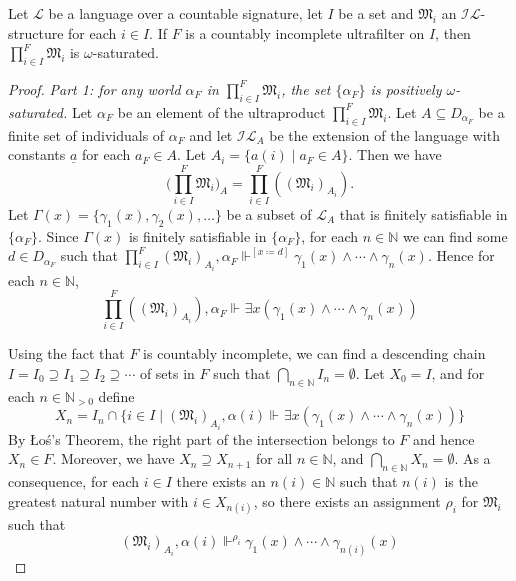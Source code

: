 \documentclass[submission,copyright,creativecommons]{eptcs}
\newcommand{\mo}{\mathfrak}
\newcommand{\IL}{\mathscr{I\!\!L}}   %
\newcommand{\LL}{\mathcal{L}}        %
\newcommand{\satisfySym}{\Vdash}
\newcommand{\satisfy}[4]{#1, #2 \satisfySym^{#4} #3}
\begin{document}
\begin{proposition}\label{prop:ultra-sat}
  Let $\LL$ be a language over a countable signature, let $I$ be a set and $\mo{M}_i$ an $\IL$-structure for each $i \in I$.
  If $F$ is a countably incomplete ultrafilter on $I$,
  then $\prod_{i \in I}^F\mo{M}_i$ is $\omega$-saturated.
\end{proposition}
\begin{proof}
\textit{Part 1: for any world $\alpha_F$ in $\prod_{i \in I}^F\mo{M}_i$,
        the set $\{ \alpha_F \}$ is positively $\omega$-saturated.}
%
  Let $\alpha_F$ be an element of the ultraproduct $\prod_{i \in I}^F \mo{M}_i$.
  Let $A \subseteq D_{\alpha_F}$ be a finite set of individuals of $\alpha_F$
  and let $\IL_A$ be the extension of the language with constants
  $\underline{a}$ for each $a_F \in A$.
  Let $A_i = \{ a(i) \mid a_F \in A \}$.
  Then we have
  \begin{equation*}
    \Big(\prod_{i \in I}^F\mo{M}_i\Big)_A = \prod_{i \in I}^F((\mo{M}_i)_{A_i}).
  \end{equation*}
% 
  Let $\Gamma(x)=\{ \gamma_1(x), \gamma_2(x), \ldots \}$ be a
  subset of $\LL_A$ that is
  finitely satisfiable in $\{ \alpha_F \}$. 
  Since $\Gamma(x)$ is finitely satisfiable in $\{ \alpha_F \}$,
  for each $n \in \mathbb{N}$ we can find some $d \in D_{\alpha_F}$ such that
  $\satisfy{\prod_{i \in I}^F(\mo{M}_i)_{A_i}}
           {\alpha_F}
           {\gamma_1(x) \wedge \cdots \wedge \gamma_n(x)}
           {[x \coloneq d]}$.
%
  Hence for each $n \in \mathbb{N}$,
  \begin{equation*} 
    \satisfy{\prod_{i \in I}^F((\mo{M}_i)_{A_i})}{\alpha_F}{\exists x(\gamma_1(x)\land\cdots\land\gamma_n(x))}{}
  \end{equation*}
  
  Using the fact that $F$ is countably incomplete,
  we can find a descending chain
  $I = I_0 \supseteq I_1 \supseteq I_2 \supseteq \cdots$ of sets in $F$
  such that $\bigcap_{n \in \mathbb{N}} I_n = \emptyset$.
  Let $X_0 = I$, and for each $n \in \mathbb{N}_{>0}$ define
  \begin{equation*}
    X_n = I_n \cap \{i \in I \mid \satisfy{(\mo{M}_i)_{A_i}}{\alpha(i)}{\exists x(\gamma_1(x)\land \cdots \wedge \gamma_n(x))}{}\}
  \end{equation*}
  By \L{}o{\'s}'s Theorem, the right part of the intersection belongs
  to $F$ and hence $X_n \in F$.
  Moreover, we have $X_n \supseteq X_{n+1}$ for all $n \in \mathbb{N}$,
  and $\bigcap_{n \in\mathbb{N}} X_n = \emptyset$. 
%
  As a consequence, for each $i \in I$ there exists an $n(i) \in \mathbb{N}$
  such that $n(i)$ is the greatest natural number with $i \in X_{n(i)}$,
  so there exists an assignment $\rho_i$ for $\mo{M}_i$ such that
  \begin{equation*}
    \satisfy{(\mo{M}_i)_{A_i}}{\alpha(i)}{\gamma_1(x)\land\cdots\land\gamma_{n(i)}(x)}{\rho_i}
  \end{equation*}


\end{proof}
\end{document}
